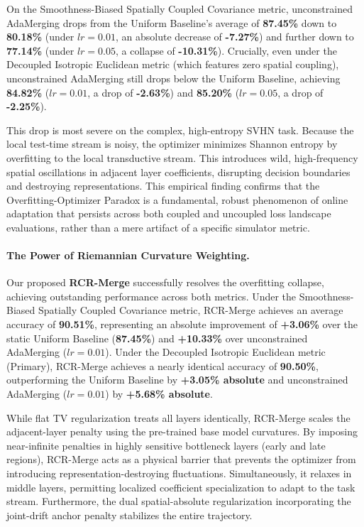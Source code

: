 On the Smoothness-Biased Spatially Coupled Covariance metric, unconstrained AdaMerging drops from the Uniform Baseline's average of \textbf{87.45\%} down to \textbf{80.18\%} (under $lr=0.01$, an absolute decrease of \textbf{-7.27\%}) and further down to \textbf{77.14\%} (under $lr=0.05$, a collapse of \textbf{-10.31\%}). Crucially, even under the Decoupled Isotropic Euclidean metric (which features zero spatial coupling), unconstrained AdaMerging still drops below the Uniform Baseline, achieving \textbf{84.82\%} ($lr=0.01$, a drop of \textbf{-2.63\%}) and \textbf{85.20\%} ($lr=0.05$, a drop of \textbf{-2.25\%}). 

This drop is most severe on the complex, high-entropy SVHN task. Because the local test-time stream is noisy, the optimizer minimizes Shannon entropy by overfitting to the local transductive stream. This introduces wild, high-frequency spatial oscillations in adjacent layer coefficients, disrupting decision boundaries and destroying representations. This empirical finding confirms that the Overfitting-Optimizer Paradox is a fundamental, robust phenomenon of online adaptation that persists across both coupled and uncoupled loss landscape evaluations, rather than a mere artifact of a specific simulator metric.

\paragraph{The Power of Riemannian Curvature Weighting.}
Our proposed \textbf{RCR-Merge} successfully resolves the overfitting collapse, achieving outstanding performance across both metrics. Under the Smoothness-Biased Spatially Coupled Covariance metric, RCR-Merge achieves an average accuracy of \textbf{90.51\%}, representing an absolute improvement of \textbf{+3.06\%} over the static Uniform Baseline (\textbf{87.45\%}) and \textbf{+10.33\%} over unconstrained AdaMerging ($lr=0.01$). Under the Decoupled Isotropic Euclidean metric (Primary), RCR-Merge achieves a nearly identical accuracy of \textbf{90.50\%}, outperforming the Uniform Baseline by \textbf{+3.05\% absolute} and unconstrained AdaMerging ($lr=0.01$) by \textbf{+5.68\% absolute}. 

While flat TV regularization treats all layers identically, RCR-Merge scales the adjacent-layer penalty using the pre-trained base model curvatures. By imposing near-infinite penalties in highly sensitive bottleneck layers (early and late regions), RCR-Merge acts as a physical barrier that prevents the optimizer from introducing representation-destroying fluctuations. Simultaneously, it relaxes in middle layers, permitting localized coefficient specialization to adapt to the task stream. Furthermore, the dual spatial-absolute regularization incorporating the joint-drift anchor penalty stabilizes the entire trajectory.

